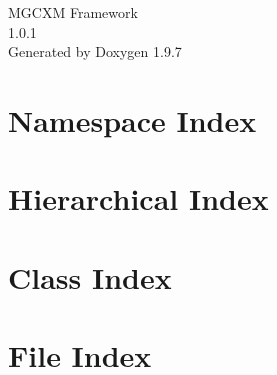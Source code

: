 \documentclass[twoside]{book}
\newcommand{\+}{\discretionary{\mbox{\scriptsize$\hookleftarrow$}}{}{}}
\newcommand{\clearemptydoublepage}{%
    \newpage{\pagestyle{empty}\cleardoublepage}%
  }
\begin{document}
  \raggedbottom
    \hypersetup{pageanchor=false,
                bookmarksnumbered=true,
                pdfencoding=unicode
               }
  \begin{titlepage}
  \vspace*{7cm}
  \begin{center}%
  {\Large MGCXM Framework}\\
  [1ex]\large 1.\+0.\+1 \\
  \vspace*{1cm}
  {\large Generated by Doxygen 1.9.7}\\
  \end{center}
  \end{titlepage}
  \clearemptydoublepage
  \tableofcontents
  \clearemptydoublepage
  \hypersetup{pageanchor=true}



\chapter{Namespace Index}

\chapter{Hierarchical Index}

\chapter{Class Index}

\chapter{File Index}

\end{document}
